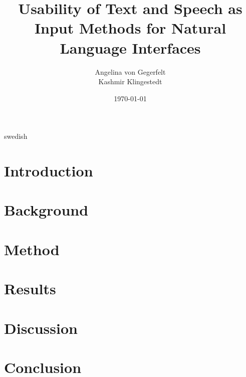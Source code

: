 \documentclass[a4paper,12pt]{kth-mag}
\title{Usability of Text and Speech as Input Methods for Natural Language Interfaces}
\author{Angelina von Gegerfelt\\Kashmir Klingestedt}
\date{\today}
\begin{document}
\frontmatter
\pagestyle{empty}
\removepagenumbers
\maketitle
{}

\begin{abstract}
\end{abstract}

\begin{foreignabstract}{swedish}
\end{foreignabstract}
\newpage

\tableofcontents*
\mainmatter
\pagestyle{newchap}

\chapter{Introduction}


\chapter{Background}


\chapter{Method}


\chapter{Results}


\chapter{Discussion}


\chapter{Conclusion}


\newpage
{} %


\appendix
\end{document}
